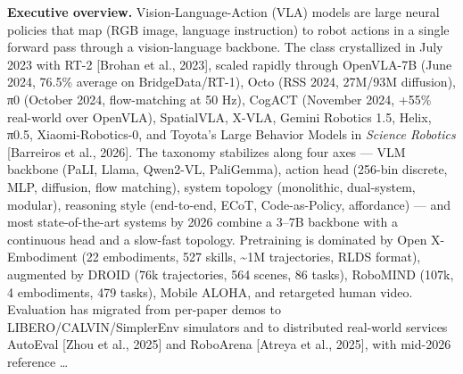 \textbf{Executive overview.} Vision-Language-Action (VLA) models are large neural policies that map (RGB image, language instruction) to robot actions in a single forward pass through a vision-language backbone. The class crystallized in July 2023 with RT-2 {[}Brohan et al., 2023{]}, scaled rapidly through OpenVLA-7B (June 2024, 76.5\% average on BridgeData/RT-1), Octo (RSS 2024, 27M/93M diffusion), π0 (October 2024, flow-matching at 50 Hz), CogACT (November 2024, +55\% real-world over OpenVLA), SpatialVLA, X-VLA, Gemini Robotics 1.5, Helix, π0.5, Xiaomi-Robotics-0, and Toyota's Large Behavior Models in \emph{Science Robotics} {[}Barreiros et al., 2026{]}. The taxonomy stabilizes along four axes --- VLM backbone (PaLI, Llama, Qwen2-VL, PaliGemma), action head (256-bin discrete, MLP, diffusion, flow matching), system topology (monolithic, dual-system, modular), reasoning style (end-to-end, ECoT, Code-as-Policy, affordance) --- and most state-of-the-art systems by 2026 combine a 3--7B backbone with a continuous head and a slow-fast topology. Pretraining is dominated by Open X-Embodiment (22 embodiments, 527 skills, \textasciitilde1M trajectories, RLDS format), augmented by DROID (76k trajectories, 564 scenes, 86 tasks), RoboMIND (107k, 4 embodiments, 479 tasks), Mobile ALOHA, and retargeted human video. Evaluation has migrated from per-paper demos to LIBERO/CALVIN/SimplerEnv simulators and to distributed real-world services AutoEval {[}Zhou et al., 2025{]} and RoboArena {[}Atreya et al., 2025{]}, with mid-2026 reference \ldots{}
